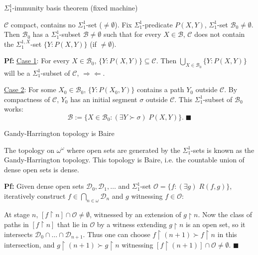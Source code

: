 \begin{frame}{$\Sigma_1^{1}$-immunity basis theorem (fixed machine)}
  \begin{lemma}
    $\mathcal{C}$ compact, contains no $\Sigma_1^{1}$-set
    ($\neq\emptyset$). Fix $\Sigma_1^{1}$-predicate $P(X,Y)$,
    $\Sigma_1^{1}$-set $\mathcal{B}_0\neq\emptyset$. Then
    $\mathcal{B}_0$ has a $\Sigma_1^{1}$-subset
    $\mathcal{B}\neq\emptyset$ such that for every $X\in\mathcal{B}$,
    $\mathcal{C}$ does not contain the $\Sigma_1^{1,X}$-set
    $\{Y:P(X,Y)\}$ (if $\neq\emptyset$).
  \end{lemma}

  \vspace{1em}
  \textbf{Pf:} \underline{Case 1}: For every $X\in\mathcal{B}_0$,
  $\{Y:P(X,Y)\}\subseteq\mathcal{C}$. Then $\bigcup_{X\in\mathcal{B}_0}
  \{Y:P(X,Y)\}$ will be a $\Sigma_1^{1}$-subset of $\mathcal{C}$,
  $\Rightarrow\Leftarrow$.

  \vspace{1em}
  \underline{Case 2}: For some $X_0\in\mathcal{B}_0$, $\{Y:P(X_0,Y)\}$
  contains a path $Y_0$ outside $\mathcal{C}$. By compactness of
  $\mathcal{C}$, $Y_0$ has an initial segment $\sigma$ outside
  $\mathcal{C}$. This $\Sigma_1^{1}$-subset of $\mathcal{B}_0$ works:
  \[\mathcal{B}:= \{X\in\mathcal{B}_0: (\exists Y\succ\sigma)\; P(X,Y)\}.\;
  \blacksquare\]
\end{frame}

\begin{frame}{Gandy-Harrington topology is Baire}
  \begin{thm}
    \label{thm:gandy-harrington}
    The topology on $\omega^\omega$ where open sets are generated by the
    $\Sigma_1^{1}$-sets is known as the Gandy-Harrington topology.  This
    topology is Baire, i.e. the countable union of dense open sets is
    dense.
  \end{thm}

  \vspace{1em}
  \textbf{Pf:} Given dense open sets
  $\mathcal{D}_0,\mathcal{D}_1,\ldots$ and
  $\Sigma_1^1$-set $\mathcal{O}=\{f:(\exists g)\; R(f,g)\}$, iteratively
  construct $f\in\bigcap_{n\in\omega}\mathcal{D}_n$ and $g$ witnessing
  $f\in\mathcal{O}$:
  
  \vspace{1em}
  At stage $n$, $[f\restriction n]\cap\mathcal{O} \neq\emptyset$, witnessed
  by an extension of $g\restriction n$. Now the class of paths in
  $[f\restriction n]$ that lie in $\mathcal{O}$ by a witness extending
  $g\restriction n$ is an open set, so it intersects
  $\mathcal{D}_0\cap\ldots\cap\mathcal{D}_{n+1}$. Thus one can choose
  $f\restriction (n+1) \succ f\restriction n$ in this intersection, and
  $g\restriction (n+1) \succ g\restriction n$ witnessing $[f\restriction
  (n+1)]\cap\mathcal{O} \neq\emptyset$. $\blacksquare$
\end{frame}

